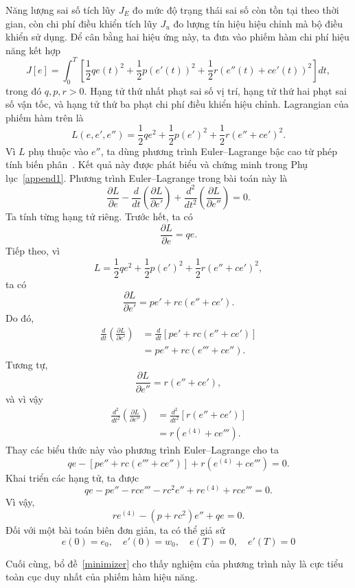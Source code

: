 ﻿\documentclass[12pt]{article}
\begin{document}
Năng lượng sai số tích lũy $J_E$ đo mức độ trạng thái sai số còn tồn tại theo thời gian, còn chi phí điều khiển tích lũy $J_u$ đo lượng tín hiệu hiệu chỉnh mà bộ điều khiển sử dụng. Để cân bằng hai hiệu ứng này, ta đưa vào phiếm hàm chi phí hiệu năng kết hợp
\[
 \boxed{ J[e] = \int_0^T \left[ \frac{1}{2}q e(t)^2 + \frac{1}{2}p(e'(t))^2 + \frac{1}{2}r(e''(t) + ce'(t))^2 \right]dt,}
\]
trong đó $q, p, r > 0$. Hạng tử thứ nhất phạt sai số vị trí, hạng tử thứ hai phạt sai số vận tốc, và hạng tử thứ ba phạt chi phí điều khiển hiệu chỉnh.
Lagrangian của phiếm hàm trên là
\[
 L(e, e', e'') = \frac{1}{2}q e^2 + \frac{1}{2}p(e')^2 + \frac{1}{2}r(e'' + ce')^2.
\]
Vì $L$ phụ thuộc vào $e''$, ta dùng phương trình Euler--Lagrange bậc cao từ phép tính biến phân~\cite{rindler2018calculus}. Kết quả này được phát biểu và chứng minh trong Phụ lục~\ref{append1}. Phương trình Euler--Lagrange trong bài toán này là
\[
 \frac{\partial L}{\partial e} - \frac{d}{dt}\left(\frac{\partial L}{\partial e'}\right) + \frac{d^2}{dt^2}\left(\frac{\partial L}{\partial e''}\right) = 0.
\]
Ta tính từng hạng tử riêng. Trước hết, ta có 
\[
 \frac{\partial L}{\partial e} = qe.
\]
Tiếp theo, vì
\[
 L = \frac{1}{2} q e^2 + \frac{1}{2} p(e')^2 + \frac{1}{2} r(e'' + ce')^2,
\]
ta có
\[
 \frac{\partial L}{\partial e'} = pe' + rc(e'' + ce').
\]
Do đó,
\[
\begin{aligned}
 \frac{d}{dt}\left(\frac{\partial L}{\partial e'}\right)
 & = \frac{d}{dt} \left[ pe' + rc(e'' + ce') \right]\\
 & = pe'' + rc(e''' + ce'').
\end{aligned}
\]
Tương tự,
\[
 \frac{\partial L}{\partial e''} = r(e'' + ce'),
\]
và vì vậy
\[
\begin{aligned}
 \frac{d^2}{dt^2}\left(\frac{\partial L}{\partial e''}\right)
 & = \frac{d^2}{dt^2} \left[ r(e'' + ce')\right]\\
 & = r(e^{(4)} + ce''').
\end{aligned}
\]
Thay các biểu thức này vào phương trình Euler--Lagrange cho ta
\[
 qe - \left[ pe'' + rc(e''' + ce'') \right] + r(e^{(4)} + ce''') = 0.
\]
Khai triển các hạng tử, ta được
\[
 qe - pe'' - rce''' - rc^2e'' + re^{(4)} + rce''' = 0.
\]
 Vì vậy,
\[
 \boxed{ re^{(4)} - (p + rc^2)e'' + qe = 0. }
\]
Đối với một bài toán biên đơn giản, ta có thể giả sử
\[
 e(0) = e_0,\quad e'(0) = w_0,\quad e(T) = 0,\quad e'(T) = 0
\]

Cuối cùng, bổ đề~\ref{minimizer} cho thấy nghiệm của phương trình này là cực tiểu toàn cục duy nhất của phiếm hàm hiệu năng.
\end{document}
